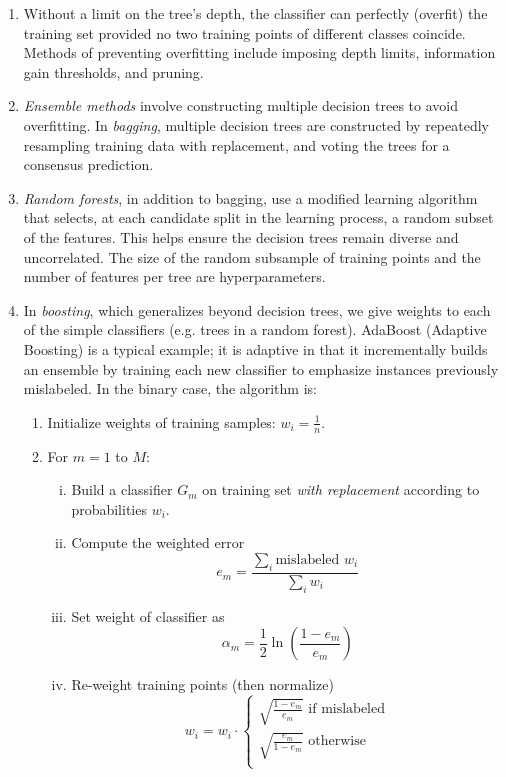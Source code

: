 \documentclass[10pt]{article}
\begin{document}
\begin{multicols}{2}
\begin{addmargin}[0.8em]{0.5em}
\begin{enumerate}[label=(\alph*)]
        \item Without a limit on the tree's depth, the classifier can perfectly (overfit) the training set provided no two training points of different classes coincide. Methods of preventing overfitting include imposing depth limits, information gain thresholds, and pruning.
        
        \item \textit{Ensemble methods} involve constructing multiple decision trees to avoid overfitting. In \textit{bagging}, multiple decision trees are constructed by repeatedly resampling training data with replacement, and voting the trees for a consensus prediction.
        
        \item \textit{Random forests}, in addition to bagging, use a modified learning algorithm that selects, at each candidate split in the learning process, a random subset of the features. This helps ensure the decision trees remain diverse and uncorrelated. The size of the random subsample of training points and the number of features per tree are hyperparameters.
        
        \item In \textit{boosting}, which generalizes beyond decision trees, we give weights to each of the simple classifiers (e.g. trees in a random forest). AdaBoost (Adaptive Boosting) is a typical example; it is adaptive in that it incrementally builds an ensemble by training each new classifier to emphasize instances previously mislabeled. In the binary case, the algorithm is:
        \begin{enumerate}[1.]
            \item Initialize weights of training samples: $w_i = \frac{1}{n}$.
            \item For $m=1$ to $M$:
            \begin{enumerate}[i.]
                \item Build a classifier $G_m$ on training set \textit{with replacement} according to probabilities $w_i$.
                \item Compute the weighted error $$e_m = \frac{\sum_i \text{mislabeled } w_i}{\sum_i w_i}$$
                \item Set weight of classifier as $$\alpha_m = \frac{1}{2} \ln \left( \frac{1-e_m}{e_m} \right)$$                
                \item Re-weight training points (then normalize)
                $$
                w_i = w_i \cdot 
                \begin{cases}
                \sqrt{\frac{1 - e_m}{e_m}} \text{ if mislabeled} \\
                \sqrt{\frac{e_m}{1 - e_m}} \text{ otherwise} \\
                \end{cases}
                $$
            \end{enumerate}
        \end{enumerate}
    \end{enumerate}  
    

\end{addmargin}
\end{multicols}
\end{document}
